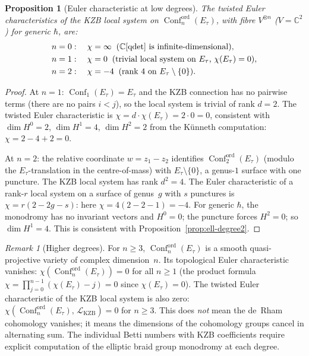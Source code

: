 \documentclass[11pt,reqno]{amsart}
\newtheorem{proposition}[theorem]{Proposition}
\theoremstyle{definition}
\theoremstyle{remark}
\newtheorem{remark}[theorem]{Remark}
\newcommand{\cL}{\mathcal{L}}
\DeclareMathOperator{\Conf}{Conf}
\newcommand{\CC}{\mathbb{C}}
\numberwithin{equation}{section}
\begin{document}
\begin{proposition}[Euler characteristic at low degrees]
\label{prop:ell-euler-n}
The twisted Euler characteristics of the KZB local system on
$\Conf_n^{\mathrm{ord}}(E_\tau)$, with fibre $V^{\otimes n}$
\textup{(}$V = \CC^2$\textup{)} for generic $\hbar$, are:
\begin{align}
  n = 0&: \quad \chi = \infty
  \;\;\text{\textup{(}$\CC[\operatorname{qdet}]$ is
  infinite-dimensional\textup{)}},
  \label{eq:euler-n0} \\
  n = 1&: \quad \chi = 0
  \;\;\text{\textup{(}trivial local system on $E_\tau$,
  $\chi(E_\tau) = 0$\textup{)}},
  \label{eq:euler-n1} \\
  n = 2&: \quad \chi = -4
  \;\;\text{\textup{(}rank $4$ on $E_\tau \setminus
  \{0\}$\textup{)}}.
  \label{eq:euler-n2}
\end{align}
\end{proposition}

\begin{proof}
At $n = 1$: $\Conf_1(E_\tau) = E_\tau$ and the KZB
connection has no pairwise terms (there are no pairs
$i < j$), so the local system is trivial of rank $d = 2$.
The twisted Euler characteristic is
$\chi = d \cdot \chi(E_\tau) = 2 \cdot 0 = 0$, consistent
with $\dim H^0 = 2$, $\dim H^1 = 4$, $\dim H^2 = 2$
from the K\"unneth computation: $\chi = 2 - 4 + 2 = 0$.

At $n = 2$: the relative coordinate $w = z_1 - z_2$
identifies $\Conf_2^{\mathrm{ord}}(E_\tau)$ (modulo the
$E_\tau$-translation in the centre-of-mass) with
$E_\tau \setminus \{0\}$, a genus-$1$ surface with one
puncture. The KZB local system has rank $d^2 = 4$. The
Euler characteristic of a rank-$r$ local system on a
surface of genus~$g$ with $s$ punctures is
$\chi = r(2 - 2g - s)$: here
$\chi = 4(2 - 2 - 1) = -4$. For generic $\hbar$, the
monodromy has no invariant vectors and
$H^0 = 0$; the puncture forces $H^2 = 0$; so
$\dim H^1 = 4$. This is consistent with
Proposition~\ref{prop:ell-degree2}.
\end{proof}

\begin{remark}[Higher degrees]
For $n \geq 3$, $\Conf_n^{\mathrm{ord}}(E_\tau)$ is a
smooth quasi-projective variety of complex dimension~$n$.
Its topological Euler characteristic vanishes:
$\chi(\Conf_n^{\mathrm{ord}}(E_\tau)) = 0$
for all $n \geq 1$ (the product formula
$\chi = \prod_{j=0}^{n-1}(\chi(E_\tau) - j) = 0$ since
$\chi(E_\tau) = 0$). The twisted Euler characteristic of the
KZB local system is also zero:
$\chi(\Conf_n^{\mathrm{ord}}(E_\tau),\,
\cL_{\mathrm{KZB}}) = 0$ for $n \geq 3$.
This does \emph{not} mean the de~Rham cohomology vanishes;
it means the dimensions of the cohomology groups cancel
in alternating sum. The individual Betti numbers with
KZB coefficients require explicit computation of the
elliptic braid group monodromy at each degree.
\end{remark}
\end{document}
